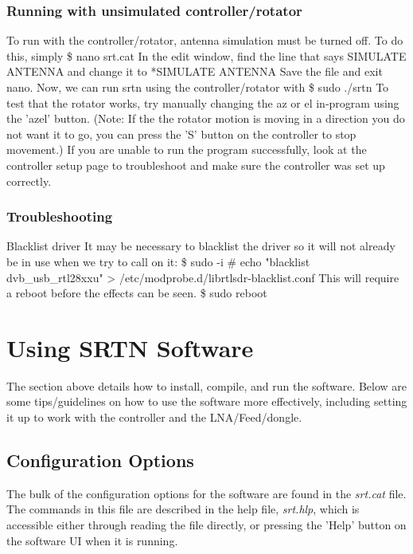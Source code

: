 \documentclass[11pt]{article} %
\begin{document}
\subsubsection{Running with unsimulated controller/rotator}
To run with the controller/rotator, antenna simulation must be turned off. To do this, simply
\$ nano srt.cat
In the edit window, find the line that says
SIMULATE ANTENNA
and change it to
*SIMULATE ANTENNA
Save the file and exit nano. Now, we can run srtn using the controller/rotator with
\$ sudo ./srtn
To test that the rotator works, try manually changing the az or el in-program using the 'azel' button. (Note: If the the rotator motion is moving in a direction you do not want it to go, you can press the 'S' button on the controller to stop movement.)
If you are unable to run the program successfully, look at the controller setup page to troubleshoot and make sure the controller was set up correctly.

\subsubsection{Troubleshooting}
Blacklist driver
It may be necessary to blacklist the driver so it will not already be in use when we try to call on it:
\$ sudo -i
\# echo "blacklist dvb\_usb\_rtl28xxu" > /etc/modprobe.d/librtlsdr-blacklist.conf
This will require a reboot before the effects can be seen.
\$ sudo reboot


\newpage
\section{Using SRTN Software}

The section above details how to install, compile, and run the software. Below are some tips/guidelines on how to use the software more effectively, including setting it up to work with the controller and the LNA/Feed/dongle.

\subsection{Configuration Options}

The bulk of the configuration options for the software are found in the \emph{srt.cat} file. The commands in this file are described in the help file, \emph{srt.hlp}, which is accessible either through reading the file directly, or pressing the 'Help' button on the software UI when it is running. 
\end{document}

